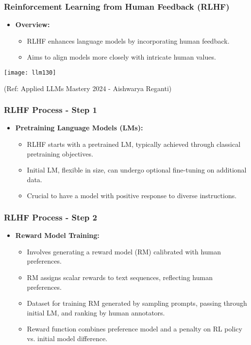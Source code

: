 \begin{frame}[fragile]\frametitle{Reinforcement Learning from Human Feedback (RLHF)}
  \begin{itemize}
    \item \textbf{Overview:}
      \begin{itemize}
        \item RLHF enhances language models by incorporating human feedback.
        \item Aims to align models more closely with intricate human values.
      \end{itemize}
  \end{itemize}
  
\begin{center}
\texttt{[image: llm130]}
\end{center}				

{\tiny (Ref: Applied LLMs Mastery 2024 - Aishwarya Reganti)}  
\end{frame}

\begin{frame}[fragile]\frametitle{RLHF Process - Step 1}
  \begin{itemize}
    \item \textbf{Pretraining Language Models (LMs):}
      \begin{itemize}
        \item RLHF starts with a pretrained LM, typically achieved through classical pretraining objectives.
        \item Initial LM, flexible in size, can undergo optional fine-tuning on additional data.
        \item Crucial to have a model with positive response to diverse instructions.
      \end{itemize}
  \end{itemize}
\end{frame}

\begin{frame}[fragile]\frametitle{RLHF Process - Step 2}
  \begin{itemize}
    \item \textbf{Reward Model Training:}
      \begin{itemize}
        \item Involves generating a reward model (RM) calibrated with human preferences.
        \item RM assigns scalar rewards to text sequences, reflecting human preferences.
        \item Dataset for training RM generated by sampling prompts, passing through initial LM, and ranking by human annotators.
        \item Reward function combines preference model and a penalty on RL policy vs. initial model difference.
      \end{itemize}
  \end{itemize}
\end{frame}

